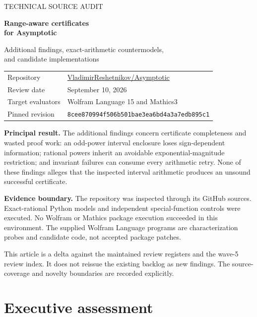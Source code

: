 \documentclass[11pt,a4paper]{article}
\newcommand{\repo}{https://github.com/VladimirReshetnikov/Asymptotic}
\begin{document}
\begin{titlepage}
\vspace*{18mm}
{\color{accent}\Large TECHNICAL SOURCE AUDIT\par}
\vspace{7mm}
{\Huge\bfseries Range-aware certificates\\[3mm]for Asymptotic\par}
\vspace{7mm}
{\Large Additional findings, exact-arithmetic countermodels,\\and candidate implementations\par}
\vspace{12mm}
\begin{tabular}{@{}ll@{}}
Repository & \href{\repo}{VladimirReshetnikov/Asymptotic}\\
Review date & September 10, 2026\\
Target evaluators & Wolfram Language 15 and Mathics3\\
Pinned revision & \texttt{8cee870994f506b501bae3ea6bd4a3a7edb895c1}
\end{tabular}\par
\vspace{12mm}
\textbf{Principal result.} The additional findings concern certificate completeness and wasted proof work: an odd-power interval enclosure loses sign-dependent information; rational powers inherit an avoidable exponential-magnitude restriction; and invariant failures can consume every arithmetic retry. None of these findings alleges that the inspected interval arithmetic produces an unsound successful certificate.

\textbf{Evidence boundary.} The repository was inspected through its GitHub sources. Exact-rational Python models and independent special-function controls were executed. No Wolfram or Mathics package execution succeeded in this environment. The supplied Wolfram Language programs are characterization probes and candidate code, not accepted package patches.

\vfill
{\color{muted}This article is a delta against the maintained review registers and the wave-5 review index. It does not reissue the existing backlog as new findings. The source-coverage and novelty boundaries are recorded explicitly.}
\end{titlepage}

\section*{Executive assessment}
\end{document}
